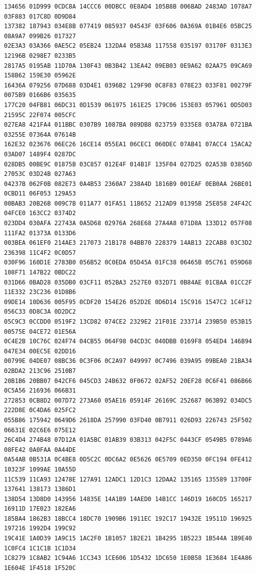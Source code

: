 \documentclass[11pt]{amsart}
\theoremstyle{remark}
\begin{document}
{\begin{verbatim}
134656 01D999 0CDC8A 14CCC6 00DBCC 0E8AD4 105B8B 006BAD 2483AD 1078A7 03F883 017C8D 0D9D84
137382 187943 034E8B 077419 085937 04543F 03F606 0A369A 01B4E6 05BC25 08A9A7 099B26 017327
02E3A3 03A366 0AE5C2 05EB24 132DA4 05B3A8 117558 035197 03170F 0313E3 12196B 0298E7 0233B5
2817A5 0195AB 11D70A 130F43 0B3B42 13EA42 09EB03 0E9A62 02AA75 09CA69 158B62 159E30 05962E
16436A 079256 07D688 03D4E1 0396B2 129F90 0C8F83 078E23 033F81 00279F 0075B9 0166B6 035635
177C20 04FB81 06DC31 0D1539 061975 161E25 179C06 153E03 057961 0D5D03 21595C 22F074 005CFC
027EA8 421FA4 011BBC 0307B9 1087BA 089DB8 023759 0335E8 03A78A 0721BA 03255E 07364A 07614B
162E32 023676 06EC26 16CE14 055EA1 06CEC1 060DEC 07AB41 07ACC4 15ACA2 03AD07 1489F4 0287DC
028DB5 00BE9C 01875B 03C857 012E4F 014B1F 135F04 027D25 02A53B 03856D 27053C 03D24B 027A63
04237B 062F0B 082E73 0A4B53 2360A7 238A4D 1816B9 001EAF 0EB0AA 26BE01 0CBD11 06F053 129A53
00BAB3 20B26B 009C7B 011A77 01FA51 11B652 212AD9 01395B 25E858 24F42C 04FCE0 163CC2 0374D2
023DD4 030AFA 22743A 0A5D68 02976A 268E68 27A4A8 071D8A 133D12 057F08 111FA2 01373A 0133D6
003BEA 061EF0 214AE3 217073 21B178 04BB70 228379 14AB13 22CAB8 03C3D2 236398 11C4F2 0C0D57
030F96 160D1E 2783B0 056B52 0C0EDA 05D45A 01FC38 06465B 05C761 059D68 108F71 147B22 0BDC22
031D66 0BAD28 035DB0 03CF11 052BA3 2527E0 032D71 0B84AE 01CBAA 01CC2F 11E332 23C236 01D8B6
09DE14 10D636 005F95 0CDF20 154E26 052D2E 0D6D14 15C916 1547C2 1C4F12 056C33 0D8C3A 0D2DC2
05C9C3 0CCDD0 0519F2 13CD82 074CE2 2329E2 21F01E 233714 239B50 053B15 00575E 04CE72 01E56A
0C4E2B 10C76C 024F74 04CB55 064F98 04CD3C 040DBB 0169F8 054ED4 146B94 047E34 00EC5E 02DD16
00799E 04DE07 08BC36 0C3F06 0C2A97 049997 0C7496 039A95 09BEA0 21BA34 02BDA2 213C96 2510B7
20B1B6 20BB07 042CF6 045CD3 24B632 0F0672 02AF52 20EF28 0C6F41 086B66 0C5A56 216936 066B31
272853 0CB8D2 007D72 273A60 05AE16 05914F 26169C 252687 063B92 034DC5 222D8E 0C4DA6 025FC2
055B86 175942 0649D6 2618DA 257990 03FD40 0B7911 026D93 226743 25F502 06631E 02C6E6 075E12
26C4D4 274B48 07D12A 01A5BC 01AB39 03B313 042F5C 0443CF 0549B5 0789A6 08FE42 0A0FAA 0A44DE
0A54AB 0B531A 0C4BE8 0D5C2C 0DC6A2 0E5626 0E5709 0ED350 0FC194 0FE412 10323F 1099AE 10A55D
11C539 11CA93 12478E 127A91 12ADC1 12D1C3 12DAA2 135165 135589 13700F 137641 138173 1386D1
138D54 13D8D0 143956 14835E 14A1B9 14AED0 14B1CC 146D19 160CD5 165217 16911D 17E023 182EA6
185BA4 1862B3 18BCC4 18DC70 1909B6 1911EC 192C17 19432E 19511D 196925 197216 1992D4 199C92
19C41E 1A0D39 1A9C15 1AC2F0 1B1057 1B2E21 1B4295 1B5223 1B544A 1B9E40 1C0FC4 1C1C1B 1C1D34
1C8279 1C8AB2 1C94A6 1CC343 1CE606 1D5432 1DC650 1E0B58 1E3684 1E4A86 1E604E 1F4518 1F520C

\end{verbatim}}
\end{document}
